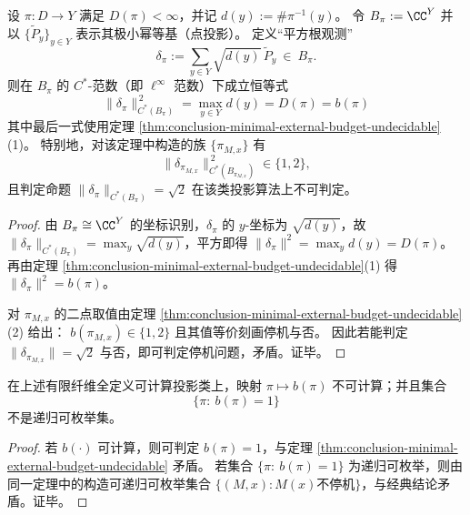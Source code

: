 \begin{corollary}\label{cor:conclusion-budget-sqrt-observable-norm-undecidable}
设 \(\pi:D\to Y\) 满足 \(D(\pi)<\infty\)，并记 \(d(y):=\#\pi^{-1}(y)\)。
令 \(B_\pi:=\CC^{Y}\) 并以 \(\{\widetilde P_y\}_{y\in Y}\) 表示其极小幂等基（点投影）。
定义“平方根观测”
\[
\delta_\pi:=\sum_{y\in Y}\sqrt{d(y)}\,\widetilde P_y\ \in\ B_\pi.
\]
则在 \(B_\pi\) 的 \(C^\ast\)-范数（即 \(\ell^\infty\) 范数）下成立恒等式
\[
\boxed{\;
\|\delta_\pi\|_{C^\ast(B_\pi)}^{\,2}
=\max_{y\in Y}d(y)
=D(\pi)
=b(\pi)\;}
\]
其中最后一式使用定理 \ref{thm:conclusion-minimal-external-budget-undecidable}(1)。
特别地，对该定理中构造的族 \(\{\pi_{M,x}\}\) 有
\[
\|\delta_{\pi_{M,x}}\|_{C^\ast(B_{\pi_{M,x}})}^{\,2}\in\{1,2\},
\]
且判定命题 \(\|\delta_{\pi}\|_{C^\ast(B_{\pi})}=\sqrt2\) 在该类投影算法上不可判定。
\end{corollary}
\begin{proof}
由 \(B_\pi\cong \CC^{Y}\) 的坐标识别，\(\delta_\pi\) 的 \(y\)-坐标为 \(\sqrt{d(y)}\)，故
\(
\|\delta_\pi\|_{C^\ast(B_\pi)}=\max_y \sqrt{d(y)}
\)，平方即得 \(\|\delta_\pi\|^2=\max_y d(y)=D(\pi)\)。
再由定理 \ref{thm:conclusion-minimal-external-budget-undecidable}(1) 得 \(\|\delta_\pi\|^2=b(\pi)\)。
\par
对 \(\pi_{M,x}\) 的二点取值由定理 \ref{thm:conclusion-minimal-external-budget-undecidable}(2) 给出：
\(
b(\pi_{M,x})\in\{1,2\}
\) 且其值等价刻画停机与否。
因此若能判定 \(\|\delta_{\pi_{M,x}}\|=\sqrt2\) 与否，即可判定停机问题，矛盾。证毕。
\end{proof}

\begin{corollary}[预算函数的不可计算性与非半可判定性]\label{cor:conclusion-external-budget-noncomputable-nonre}
在上述有限纤维全定义可计算投影类上，映射 \(\pi\mapsto b(\pi)\) 不可计算；并且集合
\[
\{\pi:\ b(\pi)=1\}
\]
不是递归可枚举集。
\end{corollary}

\begin{proof}
若 \(b(\cdot)\) 可计算，则可判定 \(b(\pi)=1\)，与定理 \ref{thm:conclusion-minimal-external-budget-undecidable} 矛盾。
若集合 \(\{\pi:\ b(\pi)=1\}\) 为递归可枚举，则由同一定理中的构造可递归可枚举集合 \(\{(M,x):M(x)\text{不停机}\}\)，与经典结论矛盾。证毕。
\end{proof}


